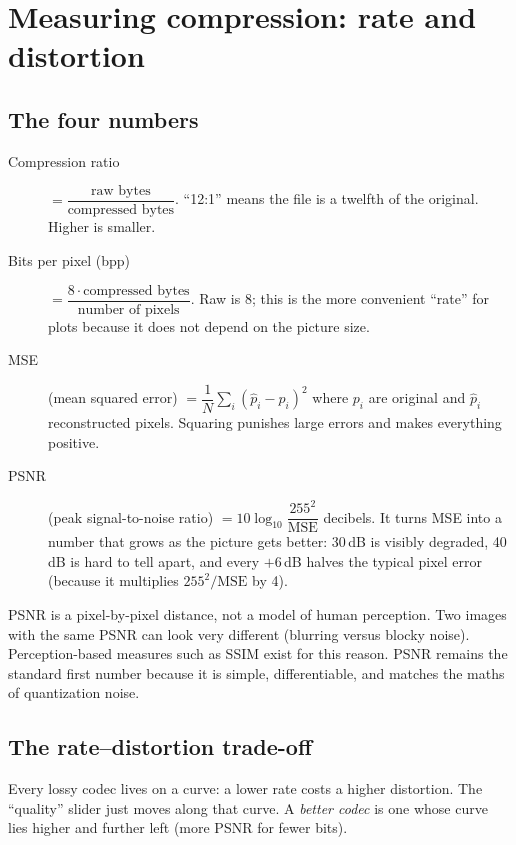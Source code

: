 \chapter{Measuring compression: rate and distortion}\label{ch:measure}

\section{The four numbers}

\begin{description}
\item[Compression ratio] $=\dfrac{\text{raw bytes}}{\text{compressed bytes}}$. ``12:1'' means the file is a twelfth of the original. Higher is smaller.
\item[Bits per pixel (bpp)] $=\dfrac{8\cdot\text{compressed bytes}}{\text{number of pixels}}$. Raw is 8; this is the more convenient ``rate'' for plots because it does not depend on the picture size.
\item[MSE] (mean squared error) $=\dfrac{1}{N}\sum_{i}(\hat p_i-p_i)^2$ where $p_i$ are original and $\hat p_i$ reconstructed pixels. Squaring punishes large errors and makes everything positive.
\item[PSNR] (peak signal-to-noise ratio) $=10\log_{10}\dfrac{255^2}{\text{MSE}}$ decibels. It turns MSE into a number that grows as the picture gets better: 30\,dB is visibly degraded, 40\,dB is hard to tell apart, and every $+6$\,dB halves the typical pixel error (because it multiplies $255^2/\text{MSE}$ by 4).
\end{description}

\begin{warn}
PSNR is a pixel-by-pixel distance, not a model of human perception. Two images with the same PSNR can look very different (blurring versus blocky noise). Perception-based measures such as SSIM exist for this reason. PSNR remains the standard first number because it is simple, differentiable, and matches the maths of quantization noise.
\end{warn}

\section{The rate--distortion trade-off}

Every lossy codec lives on a curve: a lower rate costs a higher distortion. The ``quality'' slider just moves along that curve. A \emph{better codec} is one whose curve lies higher and further left (more PSNR for fewer bits).

